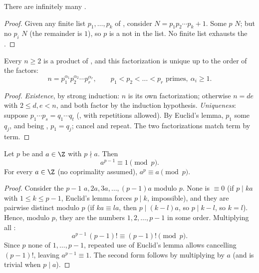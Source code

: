 \begin{theorem}[Euclid]\label{thm:g12:arith:infiniteprimes}
There are infinitely many .
\end{theorem}

\begin{proof}
Given any finite list $p_1, \dots, p_k$ of , consider
$N = p_1 p_2 \cdots p_k + 1$. Some  $p$  $N$; but no $p_i$
 $N$ (the remainder is $1$), so $p$ is a  not in the list. No
finite list exhausts the .
\end{proof}

\begin{theorem}\label{thm:g12:arith:fta}
Every  $n \geq 2$ is a product of , and this factorization is
unique up to the order of the factors:
\[
n = p_1^{\alpha_1} p_2^{\alpha_2} \cdots p_r^{\alpha_r},
\qquad p_1 < p_2 < \dots < p_r \text{ primes},\ \alpha_i \geq 1 .
\]
\end{theorem}

\begin{proof}
\emph{Existence}, by strong induction: $n$  is its own factorization;
otherwise $n = de$ with $2 \leq d, e < n$, and both factor by the induction
hypothesis. \emph{Uniqueness}: suppose
$p_1\cdots p_s = q_1 \cdots q_t$ (, with repetitions allowed). By
Euclid's lemma, $p_1$  some $q_j$, and being , $p_1 = q_j$;
cancel and repeat. The two factorizations match term by term.
\end{proof}

\begin{theorem}\label{thm:g12:arith:fermat}
Let $p$ be  and $a \in \Z$ with $p \nmid a$. Then
\[
a^{p-1} \equiv 1 \pmod p .
\]
For every $a \in \Z$ (no coprimality assumed), $a^p \equiv a \pmod p$.
\end{theorem}

\begin{proof}
Consider the $p - 1$  $a, 2a, 3a, \dots, (p-1)a$ modulo $p$. None
is $\equiv 0$ (if $p \mid ka$ with $1 \leq k \leq p-1$, Euclid's lemma forces
$p \mid k$, impossible), and they are pairwise distinct modulo $p$ (if
$ka \equiv la$, then $p \mid (k - l)a$, so $p \mid k - l$, so $k = l$).
Hence, modulo $p$, they are the numbers $1, 2, \dots, p-1$ in some order.
Multiplying all :
\[
a^{p-1}\,(p-1)! \equiv (p-1)! \pmod p .
\]
Since $p$  none of $1, \dots, p-1$, repeated use of Euclid's lemma
allows cancelling $(p-1)!$, leaving $a^{p-1} \equiv 1$. The second form
follows by multiplying by $a$ (and is trivial when $p \mid a$).
\end{proof}

